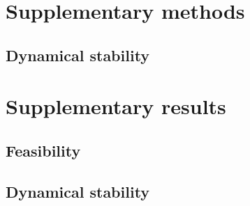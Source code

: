 \documentclass[12pt, titlepage, twoside, openright]{report}
\begin{document}
% 
\section{Supplementary methods}
%
\subsection{Dynamical stability}

%
\FloatBarrier
% 
\section{Supplementary results}
\subsection{Feasibility}

\subsection{Dynamical stability}

%

\FloatBarrier


\end{document}

